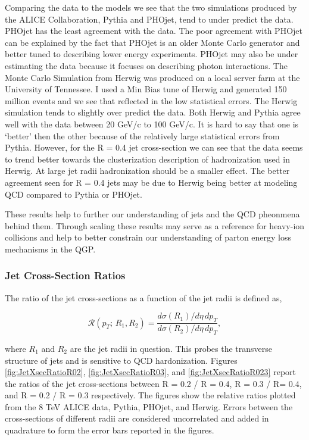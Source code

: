 Comparing the data to the models we see that the two simulations produced by the ALICE Collaboration, Pythia and PHOjet, tend to under predict the data.  PHOjet has the least agreement with the data.  The poor agreement with PHOjet can be explained by the fact that PHOjet is an older Monte Carlo generator and better tuned to describing lower energy experiments.  PHOjet may also be under estimating the data because it focuses on describing photon interactions.  The Monte Carlo Simulation from Herwig was produced on a local server farm at the University of Tennessee.  I used a Min Bias tune of Herwig and generated 150 million events and we see that reflected in the low statistical errors.  The Herwig simulation tends to slightly over predict the data.  Both Herwig and Pythia agree well with the data between 20 GeV/c to 100 GeV/c.  It is hard to say that one is `better' then the other because of the relatively large statistical errors from Pythia.  However, for the R = 0.4 jet cross-section we can see that the data seems to trend better towards the clusterization description of hadronization used in Herwig.  At large jet radii hadronization should be a smaller effect.  The better agreement seen for R = 0.4 jets may be due to Herwig being better at modeling QCD compared to Pythia or PHOjet.

These results help to further our understanding of jets and the QCD pheonmena behind them.  Through scaling these results may serve as a reference for heavy-ion collisions and help to better constrain our understanding of parton energy loss mechanisms in the QGP.  


\subsubsection{Jet Cross-Section Ratios}


\noindent
The ratio of the jet cross-sections as a function of the jet radii is defined as,

\begin{equation}
\mathscr{R} (p_{T}; \, R_{1},R_{2}) = \frac{d\sigma(R_{1}) /d\eta \, dp_{T} }{d\sigma (R_{2}) /d\eta \, dp_{T}},
\label{eq:jetxsecratio}
\end{equation}

\noindent
where $R_{1}$ and $R_{2}$ are the jet radii in question. This probes the transverse structure of jets and is sensitive to QCD hardonization\cite{SOYEZ201159}.  Figures \ref{fig:JetXsecRatioR02}, \ref{fig:JetXsecRatioR03}, and \ref{fig:JetXsecRatioR023} report the ratios of the jet cross-sections between R = 0.2 / R = 0.4, R = 0.3 / R= 0.4, and R = 0.2 / R = 0.3 respectively.  The figures show the relative ratios plotted from the 8 TeV ALICE data, Pythia, PHOjet, and Herwig.  Errors between the cross-sections of different radii are considered uncorrelated and added in quadrature to form the error bars reported in the figures.

